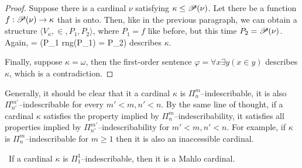 \begin{proof}
Suppose there is a cardinal $\nu$ satisfying $\kappa \leq \mathscr{P} (\nu)$. Let there be a function $f: \mathscr{P} (\nu) \rightarrow \kappa$ that is onto. Then, like in the previous paragraph, we can obtain a structure $\langle V_\kappa, \in, P_1, P_2 \rangle$, where $P_1 = f$ like before, but this time $P_2 = \mathscr{P} (\nu)$. Again, 
\beq
\varphi = (P_1 \neq \emptyset \et rng(P_1) = P_2)
\eeq
describes $\kappa$.

Finally, suppose $\kappa = \omega$, then the first-order sentence $\varphi = \forall x \exists y (x \in y)$ describes $\kappa$, which is a contradiction.
\end{proof}

Generally, it should be clear that it a cardinal $\kappa$ is $\Pi^m_n$–indescribable, it is also $\Pi^{m'}_{n'}$–indescribable for every $m'<m, n'<n$. By the same line of thought, if a cardinal $\kappa$ satisfies the property implied by $\Pi^m_n$–indescribability, it satisfies all properties implied by $\Pi^{m'}_{n'}$–indescribability for $m'<m, n'<n$. For example, if $\kappa$ is $\Pi^m_n$–indescribable for $m \geq 1$ then it is also an inaccessible cardinal.


\begin{theorem}\
If a cardinal $\kappa$ is $\Pi^1_1$–indescribable, then it is a Mahlo cardinal.
\end{theorem}

